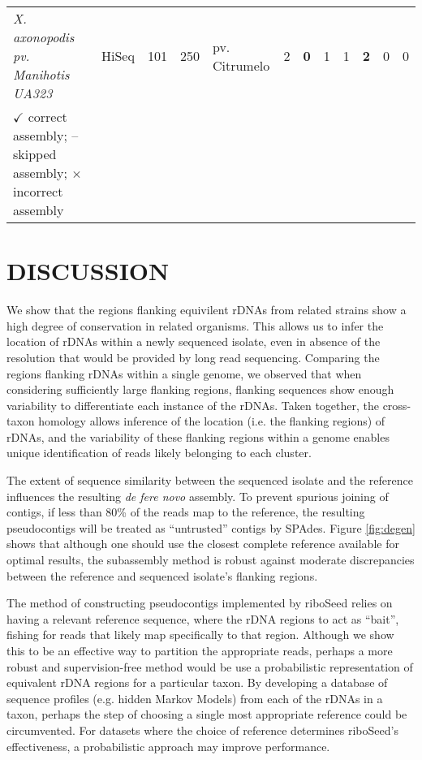 \documentclass[a4,center,fleqn]{NAR}
\begin{document}
\begin{table*}[]
\begin{tabular}{p{5.2cm}p{.95cm}p{.75cm}p{.75cm}p{2.63cm}p{.6cm}>{\hfill}p{.4cm}p{.2cm}p{.1cm}>{\hfill}p{.4cm}p{.2cm}p{.1cm}}
    \textit{X. axonopodis pv. Manihotis UA323} & HiSeq   & 101   & 250   & pv. Citrumelo & 2 & \textbf{0} & 1 & 1  & \textbf{2} & 0 & 0 \\

    \botrule
    \begin{minipage}[t]{.5\textwidth}
      {\tiny
        $\checkmark$  correct assembly; --  skipped assembly; $\times$  incorrect assembly
      }
    \end{minipage}
  \end{tabular}
\end{table*}


\section*{DISCUSSION}
We show that the regions flanking equivilent rDNAs from related strains show a high degree of conservation in related organisms. This allows us to infer the location of rDNAs within a newly sequenced isolate, even in absence of the resolution that would be provided by long read sequencing. Comparing the regions flanking rDNAs within a single genome, we observed that when considering sufficiently large flanking regions, flanking sequences show enough variability to differentiate each instance of the rDNAs. Taken together, the cross-taxon homology allows inference of the location (i.e. the flanking regions) of rDNAs, and the variability of these flanking regions within a genome enables unique identification of reads likely belonging to each cluster.

The extent of sequence similarity between the sequenced isolate and the reference influences the resulting \textit{de fere novo} assembly. To prevent spurious joining of contigs, if less than 80\% of the reads map to the reference, the resulting pseudocontigs will be treated as ``untrusted'' contigs by SPAdes. Figure \ref{fig:degen} shows that although one should use the closest complete reference available for optimal results, the subassembly method is robust against moderate discrepancies between the reference and sequenced isolate's flanking regions.

The method of constructing pseudocontigs implemented by riboSeed relies on having a relevant reference sequence, where the rDNA regions to act as ``bait'', fishing for reads that likely map specifically to that region. Although we show this to be an effective way to partition the appropriate reads, perhaps a more robust and supervision-free method would be use a probabilistic representation of equivalent rDNA regions for a particular taxon. By developing a database of sequence profiles (e.g. hidden Markov Models) from each of the rDNAs in a taxon, perhaps the step of choosing a single most appropriate reference could be circumvented. For datasets where the choice of reference determines riboSeed's effectiveness, a probabilistic approach may improve performance.
\end{document}

